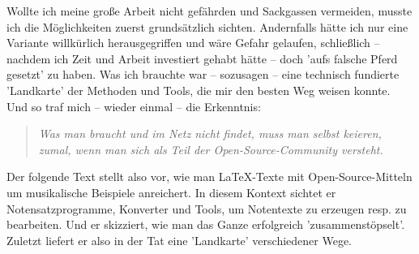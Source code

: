 Wollte ich meine große Arbeit nicht gefährden und Sackgassen vermeiden, musste
ich die Möglichkeiten zuerst grundsätzlich sichten. Andernfalls hätte ich nur
eine Variante willkürlich herausgegriffen und wäre Gefahr gelaufen, schließlich
-- nachdem ich Zeit und Arbeit investiert gehabt hätte -- doch 'aufs falsche
Pferd gesetzt' zu haben. Was ich brauchte war -- sozusagen -- eine technisch
fundierte 'Landkarte' der Methoden und Tools, die mir den besten Weg weisen
konnte. Und so traf mich -- wieder einmal -- die Erkenntnis:

\begin{quote}\textit{Was man braucht und im Netz nicht findet, muss man selbst
keieren, zumal, wenn man sich als Teil der Open-Source-Community versteht.}
\end{quote}

Der folgende Text stellt also vor, wie man \LaTeX-Texte mit Open-Source-Mitteln
um musikalische Beispiele anreichert. In diesem Kontext sichtet er
Notensatzprogramme, Konverter und Tools, um Notentexte zu erzeugen resp.
zu bearbeiten. Und er skizziert, wie man das Ganze erfolgreich
'zusammenstöpselt'. Zuletzt liefert er also in der Tat eine 'Landkarte' 
verschiedener Wege.

%
